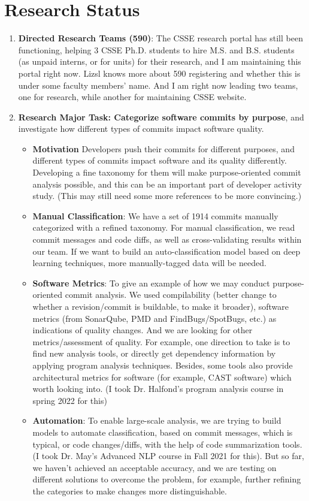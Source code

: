 \documentclass{article}
\begin{document}
\section*{Research Status}
\begin{enumerate}
    \item \textbf{Directed Research Teams (590)}: The CSSE research portal has still been functioning, helping 3 CSSE Ph.D. students to hire M.S. and B.S. students (as unpaid interns, or for units) for their research, and I am maintaining this portal right now. Lizsl knows more about 590 registering and whether this is under some faculty members’ name. And I am right now leading two teams, one for research, while another for maintaining CSSE website.


    \item \textbf{Research Major Task: Categorize software commits by purpose}, and investigate how different types of commits impact software quality.

    \begin{itemize}
        \item \textbf{Motivation} Developers push their commits for different purposes, and different types of commits impact software and its quality differently. Developing a fine taxonomy for them will make purpose-oriented commit analysis possible, and this can be an important part of developer activity study. (This may still need some more references to be more convincing.)
        \item \textbf{Manual Classification}: We have a set of 1914 commits manually categorized with a refined taxonomy. For manual classification, we read commit messages and code diffs, as well as cross-validating results within our team. If we want to build an auto-classification model based on deep learning techniques, more manually-tagged data will be needed.
        \item \textbf{Software Metrics}: To give an example of how we may conduct purpose-oriented commit analysis. We used compilability (better change to whether a revision/commit is buildable, to make it broader), software metrics (from SonarQube, PMD and FindBugs/SpotBugs, etc.) as indications of quality changes. And we are looking for other metrics/assessment of quality. For example, one direction to take is to find new analysis tools, or directly get dependency information by applying program analysis techniques. Besides, some tools also provide architectural metrics for software (for example, CAST software) which worth looking into. {\color{OliveGreen}(I took Dr. Halfond’s program analysis course in spring 2022 for this)}
        \item \textbf{Automation}: To enable large-scale analysis, we are trying to build models to automate classification, based on commit messages, which is typical, or code changes/diffs, with the help of code summarization tools. {\color{OliveGreen}(I took Dr. May’s Advanced NLP course in Fall 2021 for this)}. But so far, we haven't achieved an acceptable accuracy, and we are testing on different solutions to overcome the problem, for example, further refining the categories to make changes more distinguishable.
    \end{itemize}

\end{enumerate}
\end{document}
